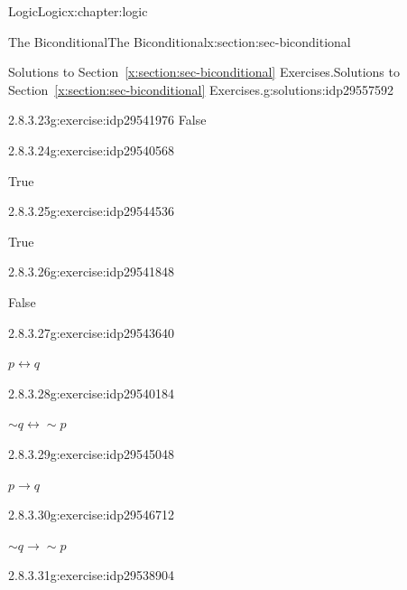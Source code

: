 \documentclass[twoside,10pt,]{book}
\newcommand{\xreffont}{\relax}
\numberwithin{equation}{section}
\newcommand{\conditional}{{p {\rightarrow} q}}
\newcommand{\contrapositive}{{\sim\!{q}{} {\rightarrow} \sim\!{p}{}}}
\newcommand{\biconditional}{{p {\leftrightarrow}{} q}}
\begin{document}
\begin{chapterptx}{Logic}{}{Logic}{}{}{x:chapter:logic}
\begin{sectionptx}{The Biconditional}{}{The Biconditional}{}{}{x:section:sec-biconditional}
\begin{solutions-subsection}{Solutions to Section~{\xreffont\ref*{x:section:sec-biconditional}} Exercises.}{}{Solutions to Section~{\xreffont\ref*{x:section:sec-biconditional}} Exercises.}{}{}{g:solutions:idp29557592}
\begin{exercisegroup}
\begin{divisionsolutioneg}{2.8.3.23}{}{g:exercise:idp29541976}
\noindent\hypertarget{g:solution:idp29543000-main}{}False\end{divisionsolutioneg}%
\begin{divisionsolutioneg}{2.8.3.24}{}{g:exercise:idp29540568}%
\par\smallskip%
\noindent\hypertarget{g:solution:idp29544792-main}{}True\end{divisionsolutioneg}%
\begin{divisionsolutioneg}{2.8.3.25}{}{g:exercise:idp29544536}%
\par\smallskip%
\noindent\hypertarget{g:solution:idp29539160-main}{}True\end{divisionsolutioneg}%
\begin{divisionsolutioneg}{2.8.3.26}{}{g:exercise:idp29541848}%
\par\smallskip%
\noindent\hypertarget{g:solution:idp29540824-main}{}False\end{divisionsolutioneg}%
\end{exercisegroup}
\par\medskip\noindent
\begin{exercisegroup}
\begin{divisionsolutioneg}{2.8.3.27}{}{g:exercise:idp29543640}%
\par\smallskip%
\noindent\hypertarget{g:solution:idp29539928-main}{}\(\biconditional\)\end{divisionsolutioneg}%
\begin{divisionsolutioneg}{2.8.3.28}{}{g:exercise:idp29540184}%
\par\smallskip%
\noindent\hypertarget{g:solution:idp29539672-main}{}\(\sim\!{q}{\leftrightarrow}\sim\!{p}\)\end{divisionsolutioneg}%
\begin{divisionsolutioneg}{2.8.3.29}{}{g:exercise:idp29545048}%
\par\smallskip%
\noindent\hypertarget{g:solution:idp29540952-main}{}\(\conditional\)\end{divisionsolutioneg}%
\begin{divisionsolutioneg}{2.8.3.30}{}{g:exercise:idp29546712}%
\par\smallskip%
\noindent\hypertarget{g:solution:idp29543896-main}{}\(\contrapositive\)\end{divisionsolutioneg}%
\end{exercisegroup}
\par\medskip\noindent
\begin{exercisegroup}
\begin{divisionsolutioneg}{2.8.3.31}{}{g:exercise:idp29538904}%

\end{divisionsolutioneg}
\end{exercisegroup}
\end{solutions-subsection}
\end{sectionptx}
\end{chapterptx}
\end{document}
